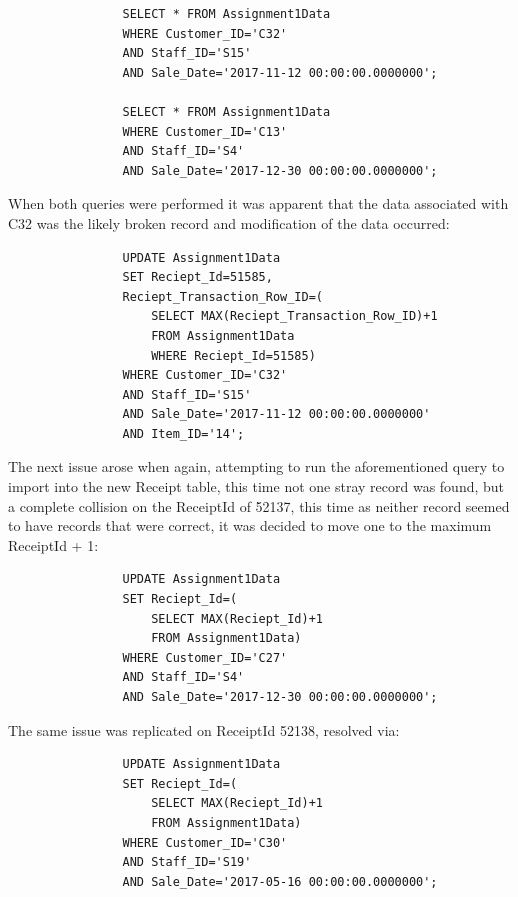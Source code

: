 \documentclass{article}
\begin{document}
            \begin{lstlisting}
                SELECT * FROM Assignment1Data 
                WHERE Customer_ID='C32' 
                AND Staff_ID='S15' 
                AND Sale_Date='2017-11-12 00:00:00.0000000';
            
                SELECT * FROM Assignment1Data 
                WHERE Customer_ID='C13' 
                AND Staff_ID='S4' 
                AND Sale_Date='2017-12-30 00:00:00.0000000';
            \end{lstlisting}

            When both queries were performed it was apparent that the data associated with C32 was 
            the likely broken record and modification of the data occurred:

            \begin{lstlisting}
                UPDATE Assignment1Data 
                SET Reciept_Id=51585, 
                Reciept_Transaction_Row_ID=(
                    SELECT MAX(Reciept_Transaction_Row_ID)+1 
                    FROM Assignment1Data
                    WHERE Reciept_Id=51585)
                WHERE Customer_ID='C32' 
                AND Staff_ID='S15' 
                AND Sale_Date='2017-11-12 00:00:00.0000000' 
                AND Item_ID='14';
            \end{lstlisting}

            The next issue arose when again, attempting to run the aforementioned query to import
            into the new Receipt table, this time not one stray record was found, but a complete
            collision on the ReceiptId of 52137, this time as neither record seemed to have 
            records that were correct, it was decided to move one to the maximum ReceiptId + 1:

            \begin{lstlisting}
                UPDATE Assignment1Data 
                SET Reciept_Id=(
                    SELECT MAX(Reciept_Id)+1 
                    FROM Assignment1Data) 
                WHERE Customer_ID='C27' 
                AND Staff_ID='S4' 
                AND Sale_Date='2017-12-30 00:00:00.0000000';
            \end{lstlisting}

            The same issue was replicated on ReceiptId 52138, resolved via:

            \begin{lstlisting}
                UPDATE Assignment1Data 
                SET Reciept_Id=(
                    SELECT MAX(Reciept_Id)+1 
                    FROM Assignment1Data) 
                WHERE Customer_ID='C30' 
                AND Staff_ID='S19' 
                AND Sale_Date='2017-05-16 00:00:00.0000000';
            \end{lstlisting}
\end{document}
